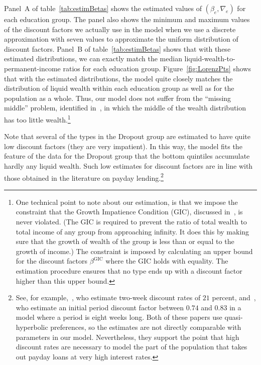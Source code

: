 \documentclass[\latexroot/\projectname]{subfiles}
\begin{document}
Panel~A of table~\ref{tab:estimBetas} shows the estimated values of $(\beta_e, \nabla_e)$ for each education group.
The panel also shows the minimum and maximum values of the discount factors we actually use in the model when we use a discrete approximation with seven values to approximate the uniform distribution of discount factors.
Panel~B of table~\ref{tab:estimBetas} shows that with these estimated distributions, we can exactly match the median liquid-wealth-to-permanent-income ratios for each education group.
Figure~\ref{fig:LorenzPts} shows that with the estimated distributions, the model quite closely matches the distribution of liquid wealth within each education group as well as for the population as a whole.
Thus, our model does not suffer from the ``missing middle'' problem, identified in~\cite{kaplanMPC2022}, in which the middle of the wealth distribution has too little wealth.\footnote{One technical point to note about our estimation, is that we impose the constraint that the Growth Impatience Condition (GIC), discussed in~\cite{carroll2022theoretical}, is never violated. (The GIC is required to prevent the ratio of total wealth to total income of any group from approaching infinity. It does this by making sure that the growth of wealth of the group is less than or equal to the growth of income.) The constraint is imposed by calculating an upper bound for the discount factors $\beta^{\text{GIC}}$ where the GIC holds with equality. The estimation procedure ensures that no type ends up with a discount factor higher than this upper bound.}



Note that several of the types in the Dropout group are estimated to have quite low discount factors (they are very impatient).
In this way, the model fits the feature of the data for the Dropout group that the bottom quintiles accumulate hardly any liquid wealth.
Such low estimates for discount factors are in line with those obtained in the literature on payday lending.\footnote{See, for example,~\cite{skiba2008payday}, who estimate two-week discount rates of $21$ percent, and~\cite{allcott2021high}, who estimate an initial period discount factor between $0.74$ and $0.83$ in a model where a period is eight weeks long.
  Both of these papers use quasi-hyperbolic preferences, so the estimates are not directly comparable with parameters in our model.
  Nevertheless, they support the point that high discount rates are necessary to model the part of the population that takes out payday loans at very high interest rates.}
\end{document}
